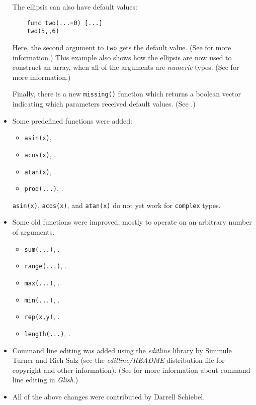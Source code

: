 \begin{itemize}
The ellipsis can also have default values:
\begin{verbatim}
    func two(...=0) [...]
    two(5,,6)
\end{verbatim}
Here, the second argument to \texttt{two} gets the default value. (See
 for more information.) This example also
shows how the ellipsis are now used to construct an array, when all
of the arguments are \emph{numeric} types. (See 
 for more information.)

Finally, there is a new \texttt{missing()} function which returns
a boolean vector indicating which parameters received default
values. (See .)

\item Some predefined functions were added:
\begin{itemize}
\item \texttt{asin(x)}, .
\item \texttt{acos(x)}, .
\item \texttt{atan(x)}, .
\item \texttt{prod(...)}, .
\end{itemize}
\texttt{asin(x)}, \texttt{acos(x)}, and \texttt{atan(x)} do not yet work for
\texttt{complex} types.

\item Some old functions were improved, mostly to operate on an arbitrary
number of arguments.
\begin{itemize}
\item \texttt{sum(...)}, .
\item \texttt{range(...)}, .
\item \texttt{max(...)}, .
\item \texttt{min(...)}, .
\item \texttt{rep(x,y)}, .
\item \texttt{length(...)}, .
\end{itemize}

\item Command line editing was added using the \emph{editline} library
by Simmule Turner and Rich Salz (see the \emph{editline/README} distribution
file for copyright and other information). (See  for more
information about command line editing in \emph{Glish}.)

\item All of the above changes were contributed by Darrell Schiebel.


\end{itemize}
